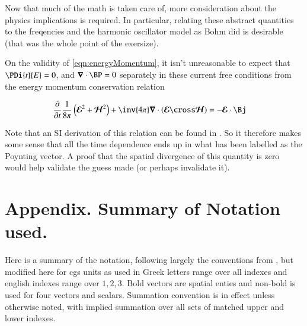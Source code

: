 \documentclass{article}
\newcommand{\EE}[0]{\boldsymbol{\mathcal{E}}}
\newcommand{\HH}[0]{\boldsymbol{\mathcal{H}}}
\begin{document}
Now that much of the math is taken care of, more consideration about the physics implications is required.  In particular, relating these
abstract quantities to the freqencies and the harmonic oscillator model as Bohm did is desirable (that was the whole point of the exersize).

On the validity of \ref{eqn:energyMomentum}, it isn't unreasonable to expect that 
$\PDi{t}{E} = 0$, and $\spacegrad \cdot \BP = 0$ separately in these current free conditions from the energy momentum conservation relation

\begin{align}
\PD{t}{}\frac{1}{8\pi} \left(\EE^2 + \HH^2\right) + \inv{4\pi} \spacegrad \cdot (\EE \cross \HH) &= -\EE \cdot \Bj 
\end{align}

Note that an SI derivation of this relation can be found in \cite{PJpoynting}.  So it therefore makes some sense that all the time dependence ends
up in what has been labelled as the Poynting vector.  A proof that the spatial divergence of this quantity is zero would help validate
the guess made (or perhaps invalidate it).

\section{ Appendix.  Summary of Notation used. }

% 
%
Here is a summary of the notation, following largely the conventions from
\cite{doran2003gap}, but modified here for cgs units as used in \cite{bohm1989qt}
Greek letters range over all indexes and
english indexes range over $1,2,3$.  Bold vectors are spatial enties and non-bold is used for four vectors and scalars.
Summation convention is in effect unless otherwise noted, with implied summation over all sets of matched upper and lower indexes.
\end{document}
